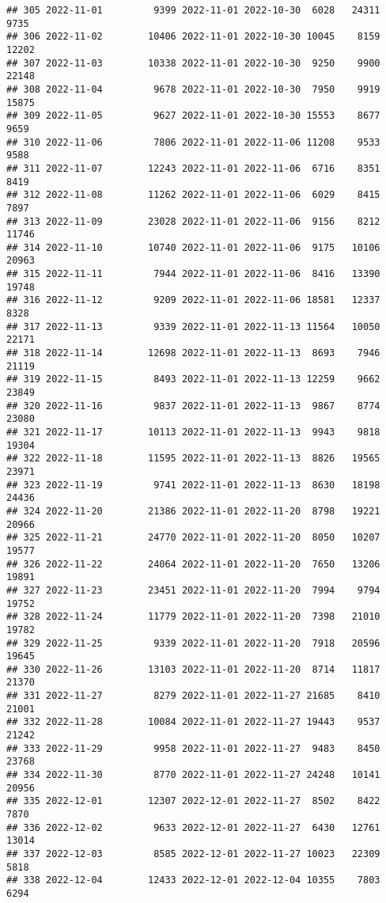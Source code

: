 \documentclass[
]{article}
\begin{document}
\begin{verbatim}
## 305 2022-11-01         9399 2022-11-01 2022-10-30  6028   24311       9735
## 306 2022-11-02        10406 2022-11-01 2022-10-30 10045    8159      12202
## 307 2022-11-03        10338 2022-11-01 2022-10-30  9250    9900      22148
## 308 2022-11-04         9678 2022-11-01 2022-10-30  7950    9919      15875
## 309 2022-11-05         9627 2022-11-01 2022-10-30 15553    8677       9659
## 310 2022-11-06         7806 2022-11-01 2022-11-06 11208    9533       9588
## 311 2022-11-07        12243 2022-11-01 2022-11-06  6716    8351       8419
## 312 2022-11-08        11262 2022-11-01 2022-11-06  6029    8415       7897
## 313 2022-11-09        23028 2022-11-01 2022-11-06  9156    8212      11746
## 314 2022-11-10        10740 2022-11-01 2022-11-06  9175   10106      20963
## 315 2022-11-11         7944 2022-11-01 2022-11-06  8416   13390      19748
## 316 2022-11-12         9209 2022-11-01 2022-11-06 18581   12337       8328
## 317 2022-11-13         9339 2022-11-01 2022-11-13 11564   10050      22171
## 318 2022-11-14        12698 2022-11-01 2022-11-13  8693    7946      21119
## 319 2022-11-15         8493 2022-11-01 2022-11-13 12259    9662      23849
## 320 2022-11-16         9837 2022-11-01 2022-11-13  9867    8774      23080
## 321 2022-11-17        10113 2022-11-01 2022-11-13  9943    9818      19304
## 322 2022-11-18        11595 2022-11-01 2022-11-13  8826   19565      23971
## 323 2022-11-19         9741 2022-11-01 2022-11-13  8630   18198      24436
## 324 2022-11-20        21386 2022-11-01 2022-11-20  8798   19221      20966
## 325 2022-11-21        24770 2022-11-01 2022-11-20  8050   10207      19577
## 326 2022-11-22        24064 2022-11-01 2022-11-20  7650   13206      19891
## 327 2022-11-23        23451 2022-11-01 2022-11-20  7994    9794      19752
## 328 2022-11-24        11779 2022-11-01 2022-11-20  7398   21010      19782
## 329 2022-11-25         9339 2022-11-01 2022-11-20  7918   20596      19645
## 330 2022-11-26        13103 2022-11-01 2022-11-20  8714   11817      21370
## 331 2022-11-27         8279 2022-11-01 2022-11-27 21685    8410      21001
## 332 2022-11-28        10084 2022-11-01 2022-11-27 19443    9537      21242
## 333 2022-11-29         9958 2022-11-01 2022-11-27  9483    8450      23768
## 334 2022-11-30         8770 2022-11-01 2022-11-27 24248   10141      20956
## 335 2022-12-01        12307 2022-12-01 2022-11-27  8502    8422       7870
## 336 2022-12-02         9633 2022-12-01 2022-11-27  6430   12761      13014
## 337 2022-12-03         8585 2022-12-01 2022-11-27 10023   22309       5818
## 338 2022-12-04        12433 2022-12-01 2022-12-04 10355    7803       6294

\end{verbatim}
\end{document}
